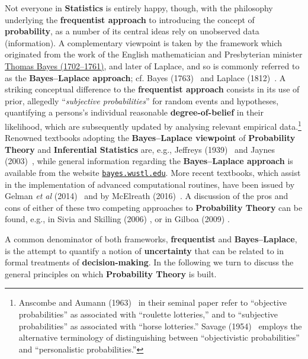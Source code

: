 \medskip
\noindent
Not everyone in \textbf{Statistics} is entirely happy, though, with 
the philosophy underlying the \textbf{frequentist approach} to
introducing the concept of \textbf{probability}, as a number of its
central ideas rely on unobserved data (information). A
complementary viewpoint is taken by the framework which originated
from the work of the English mathematician and Presbyterian
minister \href{http://www-history.mcs.st-and.ac.uk/Biographies/Bayes.html}{Thomas Bayes (1702--1761)}, and later of Laplace, and so is
commonly referred to as the \textbf{Bayes--Laplace approach}; cf. 
Bayes (1763)~ and Laplace (1812)~. A 
striking conceptual difference to the \textbf{frequentist approach} 
consists in its use of prior, allegedly ``\textit{subjective
probabilities}'' for random events and hypotheses, quantifying a
persons's individual reasonable \textbf{degree-of-belief} in their 
likelihood, which are subsequently updated by analysing relevant
empirical data.\footnote{Anscombe and Aumann (1963)~
in their seminal paper refer to ``objective probabilities'' as
associated with ``roulette lotteries,'' and to ``subjective
probabilities'' as associated with ``horse lotteries.'' Savage
(1954)~ employs the alternative terminology of
distinguishing between ``objectivistic probabilities'' and
``personalistic probabilities.''} Renowned textbooks adopting the
\textbf{Bayes--Laplace viewpoint} of \textbf{Probability Theory}
and \textbf{Inferential Statistics} are, e.g., Jeffreys
(1939)~ and Jaynes (2003)~, while general
information regarding the  \textbf{Bayes--Laplace approach} is
available from the website \href{http://bayes.wustl.edu/}{\texttt{bayes.wustl.edu}}. More recent textbooks, which assist in the
implementation of advanced computational routines, have been issued
by Gelman \textit{et al} (2014)~ and by McElreath
(2016)~. A discussion of the pros and cons of either of
these two competing approaches to \textbf{Probability Theory} can
be found, e.g., in Sivia and Skilling (2006)
, or in Gilboa (2009) .

\medskip
\noindent
A common denominator of both frameworks, \textbf{frequentist} and 
\textbf{Bayes--Laplace}, is the attempt to quantify a notion of 
\textbf{uncertainty} that can be related to in formal treatments of 
\textbf{decision-making}. In the following we turn to discuss the 
general principles on which \textbf{Probability Theory} is built.

